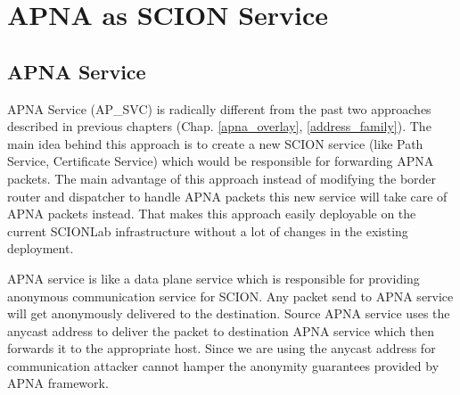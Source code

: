 
\chapter{APNA as SCION Service} %

\label{apna_service}

\section{APNA Service}
APNA Service (AP\_SVC) is radically different from the past two approaches described in previous chapters (Chap. \ref{apna_overlay}, \ref{address_family}). The main idea behind this approach is to create a new SCION service (like Path Service, Certificate Service) which would be responsible for forwarding APNA packets. The main advantage of this approach instead of modifying the border router and dispatcher to handle APNA packets this new service will take care of APNA packets instead. That makes this approach easily deployable on the current SCIONLab infrastructure without a lot of changes in the existing deployment.

APNA service is like a data plane service which is responsible for providing anonymous communication service for SCION. Any packet send to APNA service will get anonymously delivered to the destination. Source APNA service uses the anycast address to deliver the packet to destination APNA service which then forwards it to the appropriate host. Since we are using the anycast address for communication attacker cannot hamper the anonymity guarantees provided by APNA framework. 

